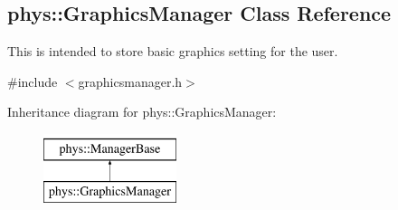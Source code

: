 \hypertarget{classphys_1_1GraphicsManager}{
\subsection{phys::GraphicsManager Class Reference}
\label{dd/d63/classphys_1_1GraphicsManager}
}


This is intended to store basic graphics setting for the user.  




{\ttfamily \#include $<$graphicsmanager.h$>$}

Inheritance diagram for phys::GraphicsManager:\begin{figure}[H]
\begin{center}
\leavevmode
\includegraphics[height=2.000000cm]{dd/d63/classphys_1_1GraphicsManager}
\end{center}
\end{figure}
